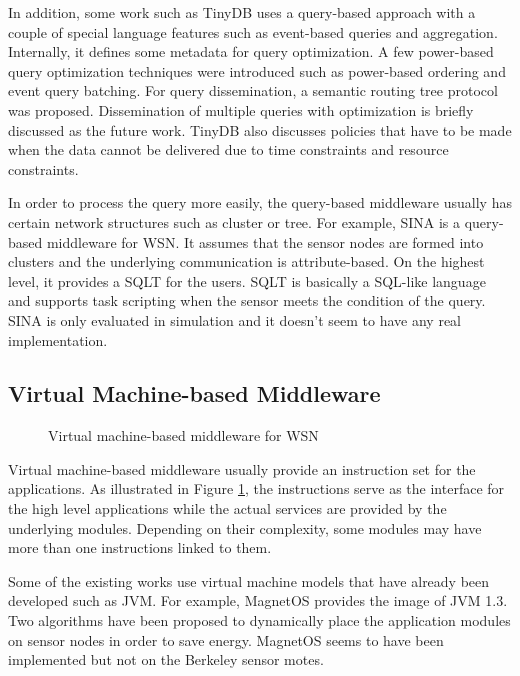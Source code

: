 In addition, some work such as TinyDB \cite{tinydb} uses a query-based approach with a couple of special language features such as event-based queries and aggregation. Internally, it defines some metadata for query optimization. A few power-based query optimization techniques were introduced such as power-based ordering and event query batching. For query dissemination, a semantic routing tree protocol was proposed. Dissemination of multiple queries with optimization is briefly discussed as the future work. TinyDB also discusses policies that have to be made when the data cannot be delivered due to time constraints and resource constraints.

In order to process the query more easily, the query-based middleware usually has certain network structures such as cluster or tree. For example, SINA is a query-based middleware for WSN. It assumes that the sensor nodes are formed into clusters and the underlying communication is attribute-based. On the highest level, it provides a SQLT for the users. SQLT is basically a SQL-like language and supports task scripting when the sensor meets the condition of the query. SINA is only evaluated in simulation and it doesn't seem to have any real implementation.

\subsection{Virtual Machine-based Middleware}

\begin{figure}
\centering
{}
\caption{Virtual machine-based middleware for WSN}
\label{fig:wsn-middleware-vm}
\end{figure}

Virtual machine-based middleware usually provide an instruction set for the applications. As illustrated in Figure \ref{fig:wsn-middleware-vm}, the instructions serve as the interface for the high level applications while the actual services are provided by the underlying modules. Depending on their complexity, some modules may have more than one instructions linked to them.

Some of the existing works use virtual machine models that have already been developed such as JVM. For example, MagnetOS \cite{magnetos} provides the image of JVM 1.3. Two algorithms have been proposed to dynamically place the application modules on sensor nodes in order to save energy. MagnetOS seems to have been implemented but not on the Berkeley sensor motes.

